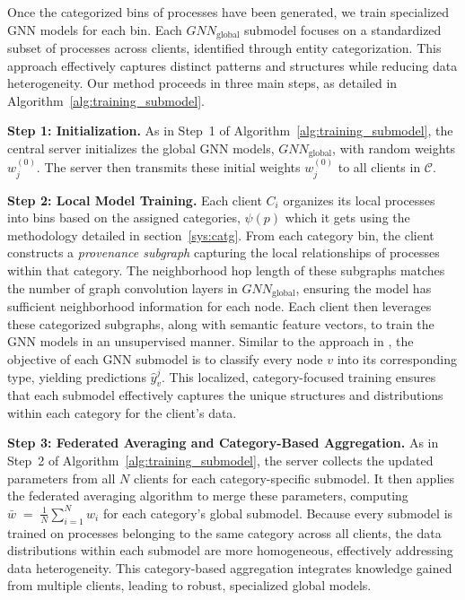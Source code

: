 Once the categorized bins of processes have been generated, we train specialized GNN models for each bin. Each \({GNN}_{\text{global}}\) submodel focuses on a standardized subset of processes across clients, identified through entity categorization. This approach effectively captures distinct patterns and structures while reducing data heterogeneity. Our method proceeds in three main steps, as detailed in Algorithm~\ref{alg:training_submodel}.

\textbf{Step 1: Initialization.} As in Step~1 of Algorithm~\ref{alg:training_submodel}, the central server initializes the global GNN models, \({GNN}_{\text{global}}\), with random weights \( w_j^{(0)} \). The server then transmits these initial weights \( w_j^{(0)} \) to all clients in \(\mathcal{C}\).

\textbf{Step 2: Local Model Training.} Each client \( C_i \) organizes its local processes into bins based on the assigned categories, \(\psi(p)\) which it gets using the methodology detailed in section~\ref{sys:catg}. From each category bin, the client constructs a \emph{provenance subgraph} capturing the local relationships of processes within that category. The neighborhood hop length of these subgraphs matches the number of graph convolution layers in \({GNN}_{\text{global}}\), ensuring the model has sufficient neighborhood information for each node. Each client then leverages these categorized subgraphs, along with semantic feature vectors, to train the GNN models in an unsupervised manner. Similar to the approach in \flash, the objective of each GNN submodel is to classify every node \(v\) into its corresponding type, yielding predictions \(\hat{y}_v^j\). This localized, category-focused training ensures that each submodel effectively captures the unique structures and distributions within each category for the client’s data.

\textbf{Step 3: Federated Averaging and Category-Based Aggregation.} As in Step~2 of Algorithm~\ref{alg:training_submodel}, the server collects the updated parameters from all \( N \) clients for each category-specific submodel. It then applies the federated averaging algorithm to merge these parameters, computing \( \bar{w} \;=\; \frac{1}{N} \sum_{i=1}^{N} w_i \)
for each category’s global submodel. Because every submodel is trained on processes belonging to the same category across all clients, the data distributions within each submodel are more homogeneous, effectively addressing data heterogeneity. This category-based aggregation integrates knowledge gained from multiple clients, leading to robust, specialized global models.

